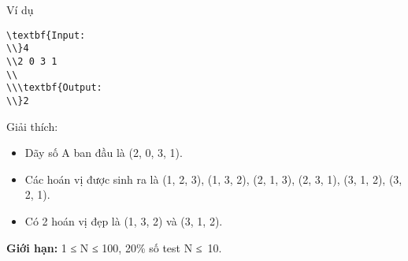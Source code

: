 Ví dụ  
\begin{verbatim}
\textbf{Input:
\\}4
\\2 0 3 1
\\
\\\textbf{Output:
\\}2\end{verbatim}
   Giải thích:  
\begin{itemize}
	\item     Dãy số A ban đầu là (2, 0, 3, 1).   
	\item     Các hoán vị được sinh ra là (1, 2, 3), (1, 3, 2), (2, 1, 3), (2, 3, 1), (3, 1, 2), (3, 2, 1).   
	\item     Có 2 hoán vị đẹp là (1, 3, 2) và (3, 1, 2).   
\end{itemize}
\textbf{    Giới hạn:   }
1 ≤ N ≤ 100, 20\% số test N ≤ 10.